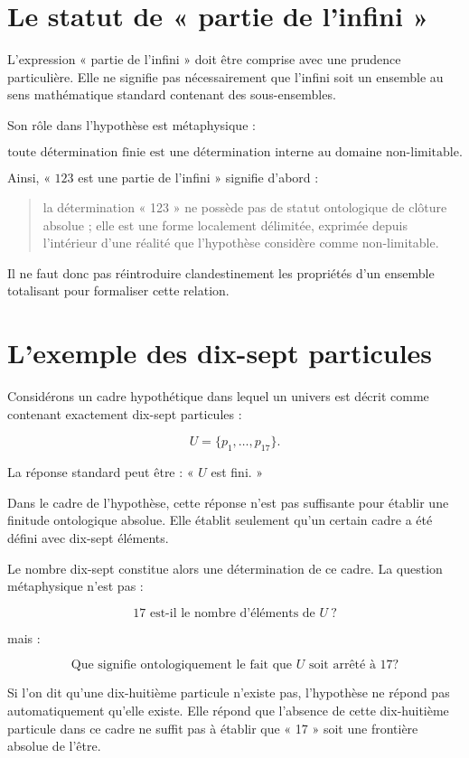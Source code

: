 \documentclass[11pt,a4paper]{article}
\begin{document}
\section{Le statut de « partie de l'infini »}

L'expression « partie de l'infini » doit être comprise avec une prudence particulière. Elle ne signifie pas nécessairement que l'infini soit un ensemble au sens mathématique standard contenant des sous-ensembles.

Son rôle dans l'hypothèse est métaphysique :

\[
\boxed{
\text{toute détermination finie est une détermination interne au domaine non-limitable}.
}
\]

Ainsi, « \(123\) est une partie de l'infini » signifie d'abord :

\begin{quote}
la détermination « 123 » ne possède pas de statut ontologique de clôture absolue ; elle est une forme localement délimitée, exprimée depuis l'intérieur d'une réalité que l'hypothèse considère comme non-limitable.
\end{quote}

Il ne faut donc pas réintroduire clandestinement les propriétés d'un ensemble totalisant pour formaliser cette relation.

\section{L'exemple des dix-sept particules}

Considérons un cadre hypothétique dans lequel un univers est décrit comme contenant exactement dix-sept particules :

\[
U = \{p_1,\dots,p_{17}\}.
\]

La réponse standard peut être : « \(U\) est fini. »

Dans le cadre de l'hypothèse, cette réponse n'est pas suffisante pour établir une finitude ontologique absolue. Elle établit seulement qu'un certain cadre a été défini avec dix-sept éléments.

Le nombre dix-sept constitue alors une détermination de ce cadre. La question métaphysique n'est pas :

\[
17 \text{ est-il le nombre d'éléments de } U\ ?
\]

mais :

\[
\text{Que signifie ontologiquement le fait que } U \text{ soit arrêté à }17 ?
\]

Si l'on dit qu'une dix-huitième particule n'existe pas, l'hypothèse ne répond pas automatiquement qu'elle existe. Elle répond que l'absence de cette dix-huitième particule dans ce cadre ne suffit pas à établir que « 17 » soit une frontière absolue de l'être.
\end{document}
